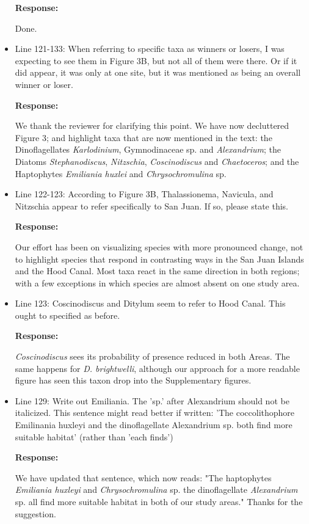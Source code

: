 \documentclass[11pt]{article}
\begin{document}
\begin{linenumbers}
\begin{itemize}
\textbf{Response:}

Done.

\item{Line 121-133: When referring to specific taxa as winners or losers, I was expecting to see them in Figure 3B, but not all of them were there. Or if it did appear, it was only at one site, but it was mentioned as being an overall winner or loser.}

\textbf{Response:}

 We thank the reviewer for clarifying this point. We have now decluttered Figure 3; and highlight taxa that are now mentioned in the text: the Dinoflagellates \textit{Karlodinium}, Gymnodinaceae sp. and \textit{Alexandrium}; the Diatoms \textit{Stephanodiscus}, \textit{Nitzschia}, \textit{Coscinodiscus} and \textit{Chaetoceros}; and the Haptophytes \textit{Emiliania huxlei} and \textit{Chrysochromulina} sp.

\item{Line 122-123: According to Figure 3B, Thalassionema, Navicula, and Nitzschia appear to refer specifically to San Juan. If so, please state this.}

\textbf{Response:}

Our effort has been on visualizing species with more pronounced change, not to highlight species that respond in contrasting ways in the San Juan Islands and the Hood Canal. Most taxa react in the same direction in both regions; with a few exceptions in which species are almost absent on one study area. 


\item{Line 123: Coscinodiscus and Ditylum seem to refer to Hood Canal. This ought to specified as before.}

\textbf{Response:}

\textit{Coscinodiscus} sees its probability of presence reduced in both Areas. The same happens for \textit{D. brightwelli}, although our approach for a more readable figure has seen this taxon drop into the Supplementary figures.


\item{Line 129: Write out Emiliania. The 'sp.' after Alexandrium should not be italicized. This sentence might read better if written: 'The coccolithophore Emilinania huxleyi and the dinoflagellate Alexandrium sp. both find more suitable habitat' (rather than 'each finds')}

\textbf{Response:}

 We have updated that sentence, which now reads: "The haptophytes \textit{Emiliania huxleyi} and \textit{Chrysochromulina} sp. the dinoflagellate \textit{Alexandrium} sp. all find more suitable habitat in both of our study areas." Thanks for the suggestion. 


\end{itemize}
\end{linenumbers}
\end{document}
